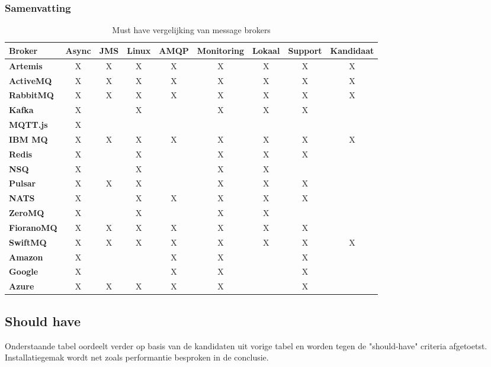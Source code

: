 \subsubsection{Samenvatting}
\begin{table}[h!]
  \centering
  \footnotesize
\begin{tabular}{|l|c|c|c|c|c|c|c|c|}
  \hline
  \textbf{Broker} & \textbf{Async} & \textbf{JMS} & \textbf{Linux} & \textbf{AMQP} & \textbf{Monitoring} & \textbf{Lokaal} & \textbf{Support} & \textbf{Kandidaat}\\ \hline
  \textbf{Artemis}   & X & X & X & X & X & X & X & X \\ \hline
  \textbf{ActiveMQ}  & X & X & X & X & X & X & X & X \\ \hline
  \textbf{RabbitMQ}  & X & X & X & X & X & X & X & X \\ \hline
  \textbf{Kafka}     & X &   & X &   & X & X & X &   \\ \hline
  \textbf{MQTT.js}   & X &   &   &   &   &   &   &   \\ \hline
  \textbf{IBM MQ}    & X & X & X & X & X & X & X & X \\ \hline
  \textbf{Redis}     & X &   & X &   & X & X & X &   \\ \hline
  \textbf{NSQ}       & X &   & X &   & X & X &   &   \\ \hline
  \textbf{Pulsar}    & X & X & X &   & X & X & X &   \\ \hline
  \textbf{NATS}      & X &   & X & X & X & X & X &   \\ \hline
  \textbf{ZeroMQ}    & X &   & X &   & X & X &   &   \\ \hline
  \textbf{FioranoMQ} & X & X & X & X & X & X & X &   \\ \hline
  \textbf{SwiftMQ}   & X & X & X & X & X & X & X & X \\ \hline
  \textbf{Amazon}    & X &   &   & X & X &   & X &   \\ \hline
  \textbf{Google}    & X &   &   & X & X &   & X &   \\ \hline
  \textbf{Azure}     & X & X & X & X & X &   & X &   \\ \hline
\end{tabular}
\caption{Must have vergelijking van message brokers }
\label{tab:vergelijking_message_brokers_must_have}
\end{table}


\newpage
\subsection{Should have} 
Onderstaande tabel oordeelt verder op basis van de kandidaten uit vorige tabel en worden tegen de "should-have" criteria afgetoetst.
Installatiegemak wordt net zoals performantie besproken in de conclusie.

